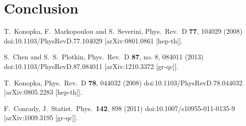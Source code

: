 \documentclass[prd,12pt,nofootinbib]{revtex4}
\begin{document}
\section{Conclusion}  
\begin{thebibliography}{99}
  


  T.~Konopka, F.~Markopoulou and S.~Severini,
  Phys.\ Rev.\ D {\bf 77}, 104029 (2008)
  doi:10.1103/PhysRevD.77.104029
  [arXiv:0801.0861 [hep-th]].

  S.~Chen and S.~S.~Plotkin,
  Phys.\ Rev.\ D {\bf 87}, no. 8, 084011 (2013)
  doi:10.1103/PhysRevD.87.084011
  [arXiv:1210.3372 [gr-qc]].


  T.~Konopka,
  Phys.\ Rev.\ D {\bf 78}, 044032 (2008)
  doi:10.1103/PhysRevD.78.044032
  [arXiv:0805.2283 [hep-th]].

  F.~Conrady,
  J.\ Statist.\ Phys.\  {\bf 142}, 898 (2011)
  doi:10.1007/s10955-011-0135-9
  [arXiv:1009.3195 [gr-qc]].
 
\end{thebibliography}
\end{document}
